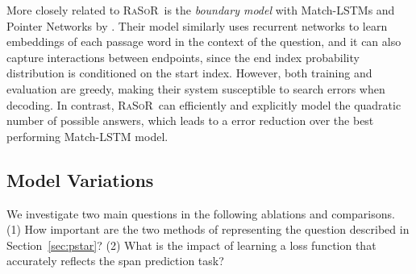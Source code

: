 \documentclass{article} \usepackage{iclr2017_conference,times}
\newcommand{\ourmodel}{\textsc{RaSoR}}
\begin{document}
More closely related to \ourmodel~is the \textit{boundary model} with Match-LSTMs and Pointer Networks by \cite{wang2016machine}.
Their model similarly uses recurrent networks to learn embeddings of each passage word in the context of the question, and it can also capture interactions between endpoints, since the end index probability distribution is conditioned on the start index.
However, both training and evaluation are greedy, making their system susceptible to search errors when decoding.
In contrast, \ourmodel~can efficiently and explicitly model the quadratic number of possible answers, which leads to a  error reduction over the best performing Match-LSTM model.

\subsection{Model Variations}
\label{sec:ablations}
We investigate two main questions in the following ablations and comparisons.
(1) How important are the two methods of representing the question described in Section~\ref{sec:pstar}?
(2) What is the impact of learning a loss function that accurately reflects the span prediction task?
\end{document}
